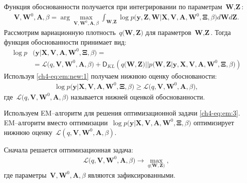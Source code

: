 \documentclass{dissert}
\begin{document}
Функция обоснованности получается при интегрировании по параметрам~$\textbf{W}, \textbf{Z}$:
\[
\label{ch4-eq:em:3}
\begin{aligned}
\mathbf{V}, \mathbf{W}^0, \textbf{A},  \beta = \arg\max_{\mathbf{V}, \mathbf{W}^0, \textbf{A}, \beta} \int_{\textbf{W}, \textbf{Z}}\log p\bigr(\mathbf{y}, \textbf{Z}, \textbf{W}|\mathbf{X}, \mathbf{V}, \textbf{A}, \textbf{W}^{0}, \bm{\Xi}, \beta\bigr)d\textbf{W}d\textbf{Z}.
\end{aligned}
\]
Рассмотрим вариационную плотность~$q\bigr(\textbf{W}, \textbf{Z}\bigr)$ для параметров~$\textbf{W}, \textbf{Z}$. Тогда функция обоснованности принимает вид:
\[
\label{ch4-eq:em:new:1}
\begin{aligned}
\log p&\bigr(\mathbf{y}|\mathbf{X}, \mathbf{V}, \textbf{A}, \textbf{W}^{0}, \bm{\Xi}, \beta\bigr) =\\
&=\mathcal{L}\bigr(q, \textbf{V}, \textbf{W}^{0}, \textbf{A}, \beta\bigr)+\mathsf{D}_{KL}\left(q\bigr(\textbf{W}, \textbf{Z}\bigr)||p\bigr(\textbf{W}, \textbf{Z}|\mathbf{y}, \mathbf{X}, \mathbf{V}, \textbf{A}, \textbf{W}^{0}, \bm{\Xi}, \beta\bigr)\right)
\end{aligned}
\]
Используя \eqref{ch4-eq:em:new:1} получаем нижнюю оценку обоснованости:
\[
\label{ch4-eq:em:new:2}
\begin{aligned}
\log p\bigr(\mathbf{y}|\mathbf{X}, \mathbf{V}, \textbf{A}, \textbf{W}^{0}, \bm{\Xi}, \beta\bigr)\geq \mathcal{L}\bigr(q, \textbf{V}, \textbf{W}^{0}, \textbf{A}, \beta\bigr),
\end{aligned}
\]
где~$\mathcal{L}\bigr(q, \textbf{V}, \textbf{W}^{0}, \textbf{A}, \beta\bigr)$ называется нижней оценкой обоснованности.

Используем EM--алгоритм для решения оптимизационной задачи \eqref{ch4-eq:em:3}. EM--алгоритм вместо оптимизации~$\log p\bigr(\mathbf{y}|\mathbf{X}, \mathbf{V}, \textbf{A}, \textbf{W}^{0}, \bm{\Xi}, \beta\bigr)$ оптимизирует нижнюю оценку~$\mathcal{L}\left(q, \textbf{V}, \textbf{W}^{0}, \textbf{A}, \beta\right)$.


Сначала решается оптимизационная задача:
\[
\label{ch4-eq:em:new:3}
\begin{aligned}
\mathcal{L}\bigr(q, \textbf{V}, \textbf{W}^{0}, \textbf{A}, \beta\bigr) \to \max_{q\bigr(\textbf{W}, \textbf{Z}\bigr)},
\end{aligned}
\]
где параметры~$\textbf{V}, \textbf{W}^{0}, \textbf{A}, \beta$ являются зафиксированными.
\end{document}
